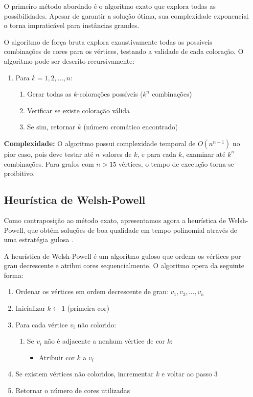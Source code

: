 \documentclass[12pt]{article}
\begin{document}
O primeiro método abordado é o algoritmo exato que explora todas as possibilidades. Apesar de garantir a solução ótima, sua complexidade exponencial o torna impraticável para instâncias grandes.

O algoritmo de força bruta explora exaustivamente todas as possíveis combinações de cores para os vértices, testando a validade de cada coloração. O algoritmo pode ser descrito recursivamente:

\begin{enumerate}
    \item Para $k = 1, 2, \ldots, n$:
    \begin{enumerate}
        \item Gerar todas as $k$-colorações possíveis ($k^n$ combinações)
        \item Verificar se existe coloração válida
        \item Se sim, retornar $k$ (número cromático encontrado)
    \end{enumerate}
\end{enumerate}

\textbf{Complexidade:} O algoritmo possui complexidade temporal de $O(n^{n+1})$ no pior caso, pois deve testar até $n$ valores de $k$, e para cada $k$, examinar até $k^n$ combinações. Para grafos com $n > 15$ vértices, o tempo de execução torna-se proibitivo.

\subsection{Heurística de Welsh-Powell}

Como contraposição ao método exato, apresentamos agora a heurística de Welsh-Powell, que obtém soluções de boa qualidade em tempo polinomial através de uma estratégia gulosa \cite{welsh1967upper}.

A heurística de Welsh-Powell é um algoritmo guloso que ordena os vértices por grau decrescente e atribui cores sequencialmente. O algoritmo opera da seguinte forma:

\begin{enumerate}
    \item Ordenar os vértices em ordem decrescente de grau: $v_1, v_2, \ldots, v_n$
    \item Inicializar $k \leftarrow 1$ (primeira cor)
    \item Para cada vértice $v_i$ não colorido:
    \begin{enumerate}
        \item Se $v_i$ não é adjacente a nenhum vértice de cor $k$:
        \begin{itemize}
            \item Atribuir cor $k$ a $v_i$
        \end{itemize}
    \end{enumerate}
    \item Se existem vértices não coloridos, incrementar $k$ e voltar ao passo 3
    \item Retornar o número de cores utilizadas
\end{enumerate}
\end{document}
